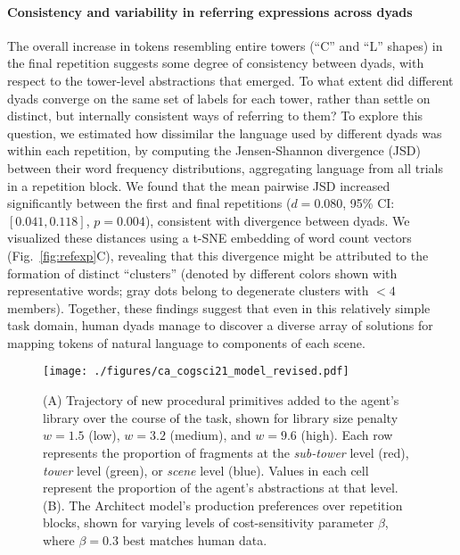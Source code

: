 \documentclass[10pt,letterpaper]{article}
\begin{document}
\paragraph{Consistency and variability in referring expressions across dyads}
The overall increase in tokens resembling entire towers (``C'' and ``L'' shapes) in the final repetition suggests some degree of consistency between dyads, with respect to the tower-level abstractions that emerged.
To what extent did different dyads converge on the same set of labels for each tower, rather than settle on distinct, but internally consistent ways of referring to them?
To explore this question, we estimated how dissimilar the language used by different dyads was within each repetition, by computing the Jensen-Shannon divergence (JSD) between their word frequency distributions, aggregating language from all trials in a repetition block. 
We found that the mean pairwise JSD increased significantly between the first and final repetitions ($d=0.080$, 95\% CI:$[0.041 , 0.118]$, $p=0.004$), consistent with divergence between dyads.
We visualized these distances using a t-SNE embedding of word count vectors (Fig.~\ref{fig:refexp}C), revealing that this divergence might be attributed to the formation of distinct ``clusters'' (denoted by different colors shown with representative words; gray dots belong to degenerate clusters with $<4$ members).
Together, these findings suggest that even in this relatively simple task domain, human dyads manage to discover a diverse array of solutions for mapping tokens of natural language to components of each scene.


\begin{figure*}[t]
\begin{center}
\texttt{[image: ./figures/ca\_cogsci21\_model\_revised.pdf]}
\caption{(A) Trajectory of new procedural primitives added to the agent's library over the course of the task, shown for library size penalty $w=1.5$ (low), $w=3.2$ (medium), and $w=9.6$ (high). Each row represents the proportion of fragments at the \emph{sub-tower} level (red), \emph{tower} level (green), or \emph{scene} level (blue). Values in each cell represent the proportion of the agent's abstractions at that level. (B). The Architect model's production preferences over repetition blocks, shown for varying levels of cost-sensitivity parameter $\beta$, where $\beta=0.3$ best matches human data.}
\label{fig:model}
\end{center}
\end{figure*}
\end{document}
